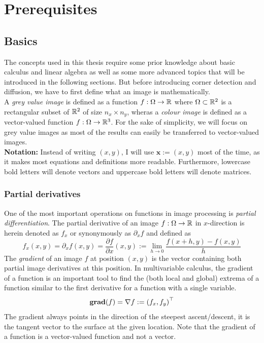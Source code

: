\newcommand{\TODO}[1]{\ \\ \textbf{\textcolor{red}{!! #1 !!}}\\}
\chapter{Prerequisites}\label{ch:Theory}
\section{Basics}\label{sec:Basics}
The concepts used in this thesis require some prior knowledge about basic calculus and linear
algebra as well as some more advanced topics that will be introduced in the following sections.
But before introducing corner detection and diffusion, we have to first define what an image is
mathematically.\\
A \textit{grey value image} is defined as a function $f: \Omega \rightarrow \mathbb{R}$ where
$\Omega \subset \mathbb{R}^2$ is a rectangular subset of $\mathbb{R}^2$ of size $n_x\times n_y$,
wheras a
\textit{colour image} is defined as a vector-valued function $f: \Omega \rightarrow \mathbb{R}^3$.
For the sake of simplicity, we will focus on grey value images as most of the results can easily be
transferred to vector-valued images.\\
\textbf{Notation:} Instead of writing $(x, y)$, I will use $\boldsymbol x := (x, y)$ most of the
time, as it makes most equations and definitions more readable. Furthermore, lowercase bold letters will denote vectors and uppercase bold letters will
denote matrices.
\subsection{Partial derivatives}
One of the most important operations on functions in image processing is \textit{partial
    differentiation}.
The partial derivative of an image $f: \Omega \rightarrow \mathbb{R}$ in $x$-direction is herein denoted as $f_x$ or
synonymously as $\partial_x f$ and defined as
\begin{equation}
    f_x(x, y) = \partial_x f (x, y) = \frac{\partial f}{\partial x} (x, y) := \lim_{h \to 0}\frac{f(x+h, y) -f(x, y)}{h} 
\end{equation}
The \textit{gradient} of an image $f$ at position $(x, y)$ is the vector containing both partial
image derivatives at this position.
In multivariable calculus, the gradient of a function is an important tool to find the (both local
and global) extrema of a function similar to the first derivative for a function with a single
variable.
\begin{equation}
    \textbf{grad}(f) = \mathbf{\nabla} f := \left(f_x, f_y\right)^\top\label{def:Grad}
\end{equation}
The gradient always points in the direction of the steepest ascent/descent, it is the tangent
vector to the surface at the given location\cite{mfi3}.
Note that the gradient of a function is a vector-valued function and not a vector.

